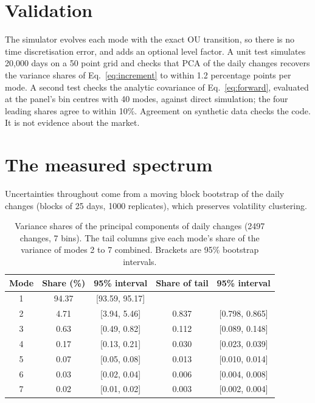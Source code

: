 \documentclass[11pt]{article}
\begin{document}
\section{Validation}
\label{sec:validation}

The simulator evolves each mode with the exact OU transition, so there is no time discretisation error, and adds an optional level factor. A unit test simulates 20{,}000 days on a 50 point grid and checks that PCA of the daily changes recovers the variance shares of Eq.~\eqref{eq:increment} to within 1.2 percentage points per mode. A second test checks the analytic covariance of Eq.~\eqref{eq:forward}, evaluated at the panel's bin centres with 40 modes, against direct simulation; the four leading shares agree to within 10\%. Agreement on synthetic data checks the code. It is not evidence about the market.

\section{The measured spectrum}
\label{sec:spectrum}

Uncertainties throughout come from a moving block bootstrap of the daily changes (blocks of 25 days, 1000 replicates), which preserves volatility clustering.

\begin{table}[t]
\centering
\caption{Variance shares of the principal components of daily changes (2497 changes, 7 bins). The tail columns give each mode's share of the variance of modes 2 to 7 combined. Brackets are 95\% bootstrap intervals.}
\label{tab:spectrum}
\begin{tabular}{ccccc}
\toprule
Mode & Share (\%) & 95\% interval & Share of tail & 95\% interval \\
\midrule
1 & 94.37 & [93.59, 95.17] & & \\
2 & 4.71 & [3.94, 5.46] & 0.837 & [0.798, 0.865] \\
3 & 0.63 & [0.49, 0.82] & 0.112 & [0.089, 0.148] \\
4 & 0.17 & [0.13, 0.21] & 0.030 & [0.023, 0.039] \\
5 & 0.07 & [0.05, 0.08] & 0.013 & [0.010, 0.014] \\
6 & 0.03 & [0.02, 0.04] & 0.006 & [0.004, 0.008] \\
7 & 0.02 & [0.01, 0.02] & 0.003 & [0.002, 0.004] \\
\bottomrule
\end{tabular}
\end{table}
\end{document}
